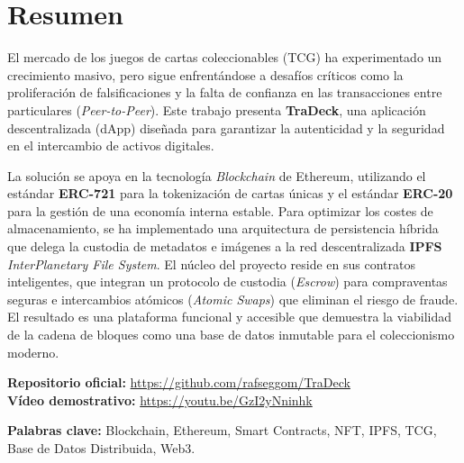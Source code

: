 \chapter*{Resumen}
El mercado de los juegos de cartas coleccionables (TCG) ha experimentado un crecimiento masivo, pero sigue enfrentándose a desafíos críticos como la proliferación de falsificaciones y la falta de confianza en las transacciones entre particulares (\textit{Peer-to-Peer}). Este trabajo presenta \textbf{TraDeck}, una aplicación descentralizada (dApp) diseñada para garantizar la autenticidad y la seguridad en el intercambio de activos digitales.

La solución se apoya en la tecnología \textit{Blockchain} de Ethereum, utilizando el estándar \textbf{ERC-721} para la tokenización de cartas únicas y el estándar \textbf{ERC-20} para la gestión de una economía interna estable. Para optimizar los costes de almacenamiento, se ha implementado una arquitectura de persistencia híbrida que delega la custodia de metadatos e imágenes a la red descentralizada \textbf{IPFS} \textit{InterPlanetary File System}. El núcleo del proyecto reside en sus contratos inteligentes, que integran un protocolo de custodia (\textit{Escrow}) para compraventas seguras e intercambios atómicos (\textit{Atomic Swaps}) que eliminan el riesgo de fraude. El resultado es una plataforma funcional y accesible que demuestra la viabilidad de la cadena de bloques como una base de datos inmutable para el coleccionismo moderno.

\vspace{0.4cm}

\noindent \textbf{Repositorio oficial:} \url{https://github.com/rafseggom/TraDeck} \\
\noindent \textbf{Vídeo demostrativo:} \url{https://youtu.be/GzI2yNninhk}

\vspace{0.6cm}

\textbf{Palabras clave:} Blockchain, Ethereum, Smart Contracts, NFT, IPFS, TCG, Base de Datos Distribuida, Web3.
